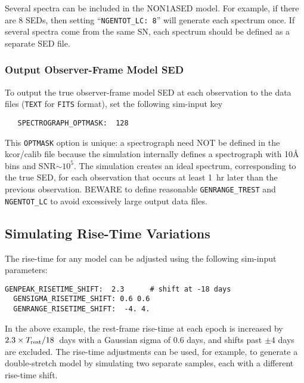 \documentclass[12pt]{article}
\newcommand{\Trest}{T_{\rm rest}}
\begin{document}
Several spectra can be included in the NON1ASED model.
For example, if there are 8 SEDs, then setting 
``{\tt NGENTOT\_LC: 8}'' will generate each spectrum once.
If several spectra come from the same SN,
each spectrum should be defined as a separate SED file.


\subsubsection{Output Observer-Frame Model SED}
\label{sss:modelSED}

To output the true observer-frame model SED at each observation
to the data files ({\tt TEXT} for {\tt FITS} format),
set the following sim-input key
 \begin{verbatim}
   SPECTROGRAPH_OPTMASK:  128 
\end{verbatim}
This {\tt OPTMASK} option is unique: 
a spectrograph need NOT be defined in the kcor/calib file
because the simulation internally defines a spectrograph with 10{\AA} bins
and SNR${\sim}10^5$. The simulation creates an ideal spectrum,
corresponding to the true SED, for each observation
that occurs at least 1~hr later than the previous observation.
BEWARE to define reasonable {\tt GENRANGE\_TREST} and {\tt NGENTOT\_LC} 
to avoid excessively large output data files.


\subsection{Simulating Rise-Time Variations}
\label{subsec:simRiseTime}

The rise-time for any model can be adjusted using 
the following sim-input parameters:
\begin{Verbatim}[frame=single]
  GENPEAK_RISETIME_SHIFT:  2.3      # shift at -18 days
  GENSIGMA_RISETIME_SHIFT: 0.6 0.6
  GENRANGE_RISETIME_SHIFT:  -4. 4.
\end{Verbatim}
%
In the above example, the rest-frame rise-time at each epoch
is increased by $2.3\times \Trest/18$~days
with a Gaussian sigma of 0.6 days,
and shifts past $\pm 4$ days are excluded.
The rise-time adjustments can be used, for example, 
to generate a double-stretch model by simulating 
two separate samples, each with a different 
rise-time shift.
\end{document}
